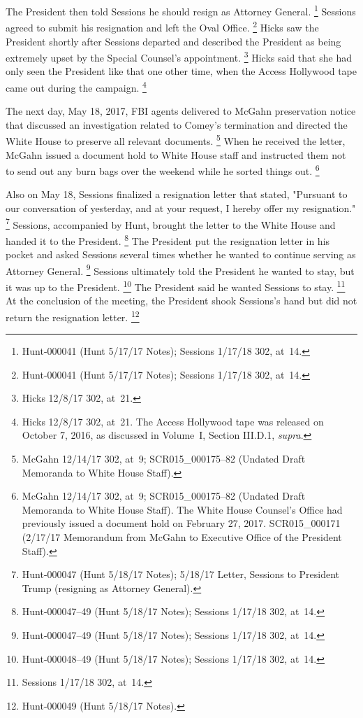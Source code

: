 {The President then told Sessions he should resign as Attorney General.%
\footnote{Hunt-000041 (Hunt 5/17/17 Notes);
Sessions 1/17/18 302, at~14.}
Sessions agreed to submit his resignation and left the Oval Office.%
\footnote{Hunt-000041 (Hunt 5/17/17 Notes);
Sessions 1/17/18 302, at~14.}
Hicks saw the President shortly after Sessions departed and described the President as being extremely upset by the Special Counsel's appointment.%
\footnote{Hicks 12/8/17 302, at~21.}
Hicks said that she had only seen the President like that one other time, when the Access Hollywood tape came out during the campaign.%
\footnote{Hicks 12/8/17 302, at~21.
The Access Hollywood tape was released on October 7, 2016, as discussed in Volume~I, Section III.D.1, \textit{supra}.}

The next day, May 18, 2017, FBI agents delivered to McGahn preservation notice that discussed an investigation related to Comey's termination and directed the White House to preserve all relevant documents.%
\footnote{McGahn 12/14/17 302, at~9;
SCR015\_000175--82 (Undated Draft Memoranda to White House Staff).}
When he received the letter, McGahn issued a document hold to White House staff and instructed them not to send out any burn bags over the weekend while he sorted things out.%
\footnote{McGahn 12/14/17 302, at~9;
SCR015\_000175--82 (Undated Draft Memoranda to White House Staff).
The White House Counsel's Office had previously issued a document hold on February 27, 2017.
SCR015\_000171 (2/17/17 Memorandum from McGahn to Executive Office of the President Staff).}

Also on May 18, Sessions finalized a resignation letter that stated, "Pursuant to our conversation of yesterday, and at your request, I hereby offer my resignation."%
\footnote{Hunt-000047 (Hunt 5/18/17 Notes); 5/18/17 Letter, Sessions to President Trump (resigning as Attorney General).}
Sessions, accompanied by Hunt, brought the letter to the White House and handed it to the President.%
\footnote{Hunt-000047--49 (Hunt 5/18/17 Notes);
Sessions 1/17/18 302, at~14.}
The President put the resignation letter in his pocket and asked Sessions several times whether he wanted to continue serving as Attorney General.%
\footnote{Hunt-000047--49 (Hunt 5/18/17 Notes);
Sessions 1/17/18 302, at~14.}
Sessions ultimately told the President he wanted to stay, but it was up to the President.%
\footnote{Hunt-000048--49 (Hunt 5/18/17 Notes);
Sessions 1/17/18 302, at~14.}
The President said he wanted Sessions to stay.%
\footnote{Sessions 1/17/18 302, at~14.}
At the conclusion of the meeting, the President shook Sessions's hand but did not return the resignation letter.%
\footnote{Hunt-000049 (Hunt 5/18/17 Notes).}

}
